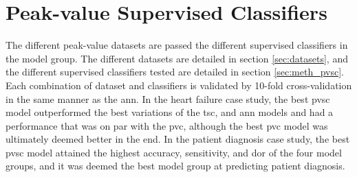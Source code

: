 \section{Peak-value Supervised Classifiers} \label{sec:disc_pvsc}
The different peak-value datasets are passed the different supervised classifiers in the model group. The different datasets are detailed in section \ref{sec:datasets}, and the different supervised classifiers tested are detailed in section \ref{sec:meth_pvsc}. Each combination of dataset and classifiers is validated by 10-fold cross-validation in the same manner as the \acrshort{ann}. 
In the heart failure case study, the best \acrshort{pvsc} model outperformed the best variations of the \acrshort{tsc}, and \acrshort{ann} models and had a performance that was on par with the \acrshort{pvc}, although the best \acrshort{pvc} model was ultimately deemed better in the end. In the patient diagnosis case study, the best \acrshort{pvsc} model attained the highest accuracy, sensitivity, and \acrshort{dor} of the four model groups, and it was deemed the best model group at predicting patient diagnosis. \bigskip
